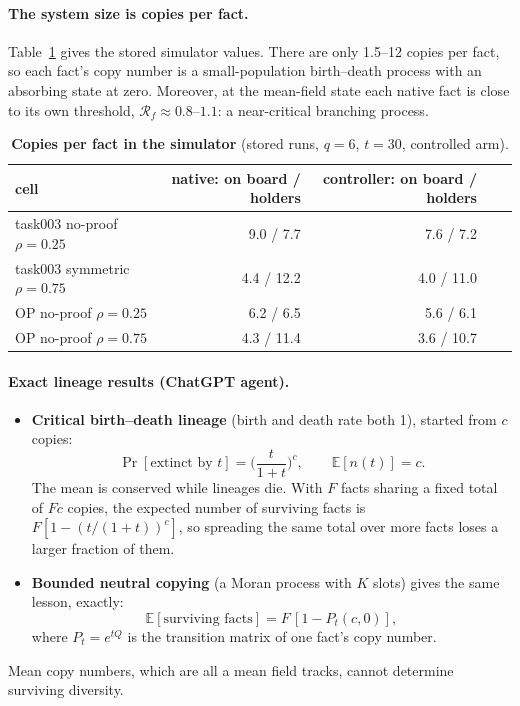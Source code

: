 \documentclass[10pt,a4paper]{article}
\theoremstyle{definition}
\newcommand{\E}{\mathbb E}
\begin{document}
\paragraph{The system size is copies per fact.} Table~\ref{tab:copies} gives the stored simulator values. There are
only 1.5--12 copies per fact, so each fact's copy number is a small-population birth--death process with an absorbing
state at zero. Moreover, at the mean-field state each native fact is close to its own threshold,
$\mathcal R_f\approx0.8$--$1.1$: a near-critical branching process.
\begin{table}[h]
\centering\small
\caption{\textbf{Copies per fact in the simulator} (stored runs, $q=6$, $t=30$, controlled arm).}
\label{tab:copies}
\begin{tabular}{@{}lrrrr@{}}\toprule
cell & native: on board / holders & controller: on board / holders\\\midrule
task003 no-proof $\rho=0.25$ & 9.0 / 7.7 & 7.6 / 7.2\\
task003 symmetric $\rho=0.75$ & 4.4 / 12.2 & 4.0 / 11.0\\
OP no-proof $\rho=0.25$ & 6.2 / 6.5 & 5.6 / 6.1\\
OP no-proof $\rho=0.75$ & 4.3 / 11.4 & 3.6 / 10.7\\\bottomrule
\end{tabular}
\end{table}

\paragraph{Exact lineage results (ChatGPT agent).}
\begin{itemize}
\item \textbf{Critical birth--death lineage} (birth and death rate both 1), started from $c$ copies:
  \begin{equation}
  \Pr[\text{extinct by }t]=\Big(\frac{t}{1+t}\Big)^{c},\qquad \E[n(t)]=c .
  \end{equation}
  The mean is conserved while lineages die. With $F$ facts sharing a fixed total of $Fc$ copies, the expected number of
  surviving facts is $F[1-(t/(1+t))^c]$, so spreading the same total over more facts loses a larger fraction of them.
\item \textbf{Bounded neutral copying} (a Moran process with $K$ slots) gives the same lesson, exactly:
  \begin{equation}
  \E[\text{surviving facts}]=F\,[1-P_t(c,0)],
  \end{equation}
  where $P_t=e^{tQ}$ is the transition matrix of one fact's copy number.
\end{itemize}
Mean copy numbers, which are all a mean field tracks, cannot determine surviving diversity.
\end{document}
